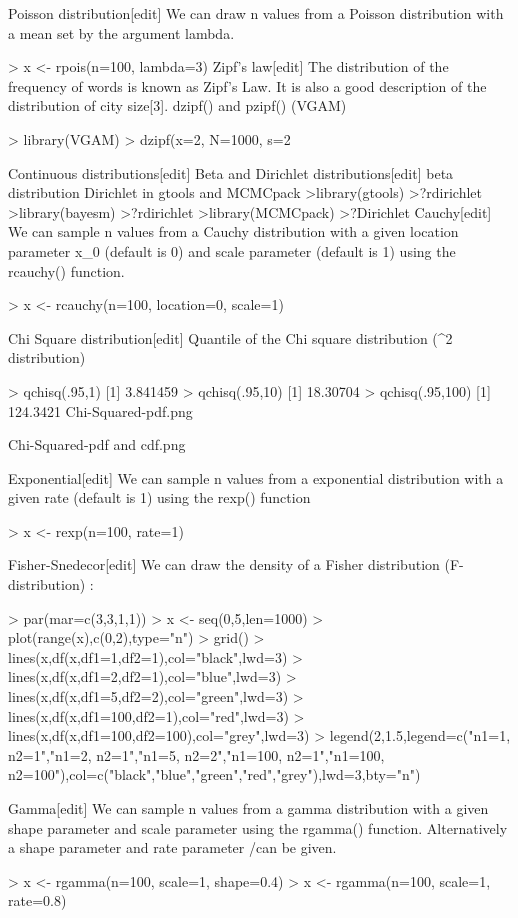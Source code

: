 \documentclass[12pt, a4paper]{article}
\theoremstyle{plain}
\theoremstyle{definition}
\theoremstyle{remark}
\begin{document}
Poisson distribution[edit]
We can draw n values from a Poisson distribution with a mean set by the argument lambda.

> x <- rpois(n=100, lambda=3)
Zipf's law[edit]
The distribution of the frequency of words is known as Zipf's Law. It is also a good description of the distribution of city size[3]. dzipf() and pzipf() (VGAM)

> library(VGAM)
> dzipf(x=2, N=1000, s=2


Continuous distributions[edit]
Beta and Dirichlet distributions[edit]
beta distribution
Dirichlet in gtools and MCMCpack
>library(gtools)
>?rdirichlet
>library(bayesm)
>?rdirichlet
>library(MCMCpack)
>?Dirichlet
Cauchy[edit]
We can sample n values from a Cauchy distribution with a given location parameter x_0 (default is 0) and scale parameter \gamma (default is 1) using the rcauchy() function.

> x <- rcauchy(n=100, location=0, scale=1)


Chi Square distribution[edit]
Quantile of the Chi square distribution (\chi^2 distribution)

> qchisq(.95,1)
[1] 3.841459
> qchisq(.95,10)
[1] 18.30704
> qchisq(.95,100)
[1] 124.3421
Chi-Squared-pdf.png
 
Chi-Squared-pdf and cdf.png


Exponential[edit]
We can sample n values from a exponential distribution with a given rate (default is 1) using the rexp() function

> x <- rexp(n=100, rate=1)


Fisher-Snedecor[edit]
We can draw the density of a Fisher distribution (F-distribution) :

> par(mar=c(3,3,1,1))
> x <- seq(0,5,len=1000)
> plot(range(x),c(0,2),type="n")
> grid()
> lines(x,df(x,df1=1,df2=1),col="black",lwd=3)
> lines(x,df(x,df1=2,df2=1),col="blue",lwd=3)
> lines(x,df(x,df1=5,df2=2),col="green",lwd=3)
> lines(x,df(x,df1=100,df2=1),col="red",lwd=3)
> lines(x,df(x,df1=100,df2=100),col="grey",lwd=3)
> legend(2,1.5,legend=c("n1=1, n2=1","n1=2, n2=1","n1=5, n2=2","n1=100, n2=1","n1=100, n2=100"),col=c("black","blue","green","red","grey"),lwd=3,bty="n")


Gamma[edit]
We can sample n values from a gamma distribution with a given shape parameter and scale parameter \theta using the rgamma() function. Alternatively a shape parameter and rate parameter /\theta can be given.

> x <- rgamma(n=100, scale=1, shape=0.4)
> x <- rgamma(n=100, scale=1, rate=0.8)
\end{document}
